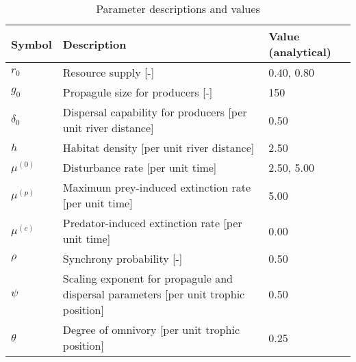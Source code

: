 \begin{table}[ht]
\centering
\caption{Parameter descriptions and values\label{tab:parms}} 
\begingroup\small
\begin{tabularx}{\textwidth}{lll}
  \hline
Symbol & Description & Value (analytical) \\ 
  \hline
$r_0$ & Resource supply [-] & 0.40, 0.80 \\ 
  $g_0$ & Propagule size for producers [-] & 150 \\ 
  $\delta_0$ & Dispersal capability for producers [per unit river distance] & 0.50 \\ 
  $h$ & Habitat density [per unit river distance] & 2.50 \\ 
  $\mu^{(0)}$ & Disturbance rate [per unit time] & 2.50, 5.00 \\ 
  $\mu^{(p)}$ & Maximum prey-induced extinction rate [per unit time] & 5.00 \\ 
  $\mu^{(c)}$ & Predator-induced extinction rate [per unit time] & 0.00 \\ 
  $\rho$ & Synchrony probability [-] & 0.50 \\ 
  $\psi$ & Scaling exponent for propagule and dispersal parameters [per unit trophic position] & 0.50 \\ 
  $\theta$ & Degree of omnivory [per unit trophic position] & 0.25 \\ 
   \hline
\end{tabularx}
\endgroup
\end{table}
